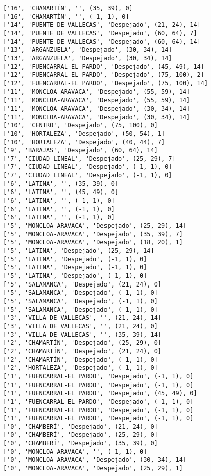 \documentclass[11pt]{article}
\begin{document}
\begin{Verbatim}[commandchars=\\\{\}]
['16', 'CHAMARTÍN', '', (35, 39), 0]
['16', 'CHAMARTÍN', '', (-1, 1), 0]
['14', 'PUENTE DE VALLECAS', 'Despejado', (21, 24), 14]
['14', 'PUENTE DE VALLECAS', 'Despejado', (60, 64), 7]
['14', 'PUENTE DE VALLECAS', 'Despejado', (60, 64), 14]
['13', 'ARGANZUELA', 'Despejado', (30, 34), 14]
['13', 'ARGANZUELA', 'Despejado', (30, 34), 14]
['12', 'FUENCARRAL-EL PARDO', 'Despejado', (45, 49), 14]
['12', 'FUENCARRAL-EL PARDO', 'Despejado', (75, 100), 2]
['12', 'FUENCARRAL-EL PARDO', 'Despejado', (75, 100), 14]
['11', 'MONCLOA-ARAVACA', 'Despejado', (55, 59), 14]
['11', 'MONCLOA-ARAVACA', 'Despejado', (55, 59), 14]
['11', 'MONCLOA-ARAVACA', 'Despejado', (30, 34), 14]
['11', 'MONCLOA-ARAVACA', 'Despejado', (30, 34), 14]
['10', 'CENTRO', 'Despejado', (75, 100), 0]
['10', 'HORTALEZA', 'Despejado', (50, 54), 1]
['10', 'HORTALEZA', 'Despejado', (40, 44), 7]
['9', 'BARAJAS', 'Despejado', (60, 64), 14]
['7', 'CIUDAD LINEAL', 'Despejado', (25, 29), 7]
['7', 'CIUDAD LINEAL', 'Despejado', (-1, 1), 0]
['7', 'CIUDAD LINEAL', 'Despejado', (-1, 1), 0]
['6', 'LATINA', '', (35, 39), 0]
['6', 'LATINA', '', (45, 49), 0]
['6', 'LATINA', '', (-1, 1), 0]
['6', 'LATINA', '', (-1, 1), 0]
['6', 'LATINA', '', (-1, 1), 0]
['5', 'MONCLOA-ARAVACA', 'Despejado', (25, 29), 14]
['5', 'MONCLOA-ARAVACA', 'Despejado', (35, 39), 7]
['5', 'MONCLOA-ARAVACA', 'Despejado', (18, 20), 1]
['5', 'LATINA', 'Despejado', (25, 29), 14]
['5', 'LATINA', 'Despejado', (-1, 1), 0]
['5', 'LATINA', 'Despejado', (-1, 1), 0]
['5', 'LATINA', 'Despejado', (-1, 1), 0]
['5', 'SALAMANCA', 'Despejado', (21, 24), 0]
['5', 'SALAMANCA', 'Despejado', (-1, 1), 0]
['5', 'SALAMANCA', 'Despejado', (-1, 1), 0]
['5', 'SALAMANCA', 'Despejado', (-1, 1), 0]
['3', 'VILLA DE VALLECAS', '', (21, 24), 14]
['3', 'VILLA DE VALLECAS', '', (21, 24), 0]
['3', 'VILLA DE VALLECAS', '', (35, 39), 14]
['2', 'CHAMARTÍN', 'Despejado', (25, 29), 0]
['2', 'CHAMARTÍN', 'Despejado', (21, 24), 0]
['2', 'CHAMARTÍN', 'Despejado', (-1, 1), 0]
['2', 'HORTALEZA', 'Despejado', (-1, 1), 0]
['1', 'FUENCARRAL-EL PARDO', 'Despejado', (-1, 1), 0]
['1', 'FUENCARRAL-EL PARDO', 'Despejado', (-1, 1), 0]
['1', 'FUENCARRAL-EL PARDO', 'Despejado', (45, 49), 0]
['1', 'FUENCARRAL-EL PARDO', 'Despejado', (-1, 1), 0]
['1', 'FUENCARRAL-EL PARDO', 'Despejado', (-1, 1), 0]
['1', 'FUENCARRAL-EL PARDO', 'Despejado', (-1, 1), 0]
['0', 'CHAMBERÍ', 'Despejado', (21, 24), 0]
['0', 'CHAMBERÍ', 'Despejado', (25, 29), 0]
['0', 'CHAMBERÍ', 'Despejado', (35, 39), 0]
['0', 'MONCLOA-ARAVACA', '', (-1, 1), 0]
['0', 'MONCLOA-ARAVACA', 'Despejado', (30, 34), 14]
['0', 'MONCLOA-ARAVACA', 'Despejado', (25, 29), 1]

\end{Verbatim}
\end{document}
